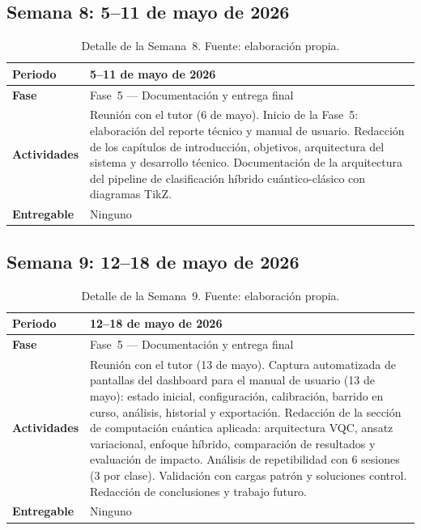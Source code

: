 \documentclass[11pt,a4paper,spanish]{book}
\begin{document}
\subsection{Semana 8: 5--11 de mayo de 2026}

\begin{table}[ht]
\centering
\begin{tabular}{p{3cm} p{10cm}}
\hline\hline
\textbf{Periodo} & 5--11 de mayo de 2026 \\ [0.5ex]
\hline
\textbf{Fase} & Fase~5 --- Documentaci\'{o}n y entrega final \\ \hline
\textbf{Actividades} & Reuni\'{o}n con el tutor (6 de mayo). Inicio de la Fase~5: elaboraci\'{o}n del reporte t\'{e}cnico y manual de usuario. Redacci\'{o}n de los cap\'{i}tulos de introducci\'{o}n, objetivos, arquitectura del sistema y desarrollo t\'{e}cnico. Documentaci\'{o}n de la arquitectura del pipeline de clasificaci\'{o}n h\'{i}brido cu\'{a}ntico-cl\'{a}sico con diagramas TikZ. \\ \hline
\textbf{Entregable} & Ninguno \\ \hline
\end{tabular}
\caption[Semana 8]{Detalle de la Semana~8. Fuente: elaboraci\'{o}n propia.}
\label{tab:semana8}
\end{table}

\subsection{Semana 9: 12--18 de mayo de 2026}

\begin{table}[ht]
\centering
\begin{tabular}{p{3cm} p{10cm}}
\hline\hline
\textbf{Periodo} & 12--18 de mayo de 2026 \\ [0.5ex]
\hline
\textbf{Fase} & Fase~5 --- Documentaci\'{o}n y entrega final \\ \hline
\textbf{Actividades} & Reuni\'{o}n con el tutor (13 de mayo). Captura automatizada de pantallas del dashboard para el manual de usuario (13 de mayo): estado inicial, configuraci\'{o}n, calibraci\'{o}n, barrido en curso, an\'{a}lisis, historial y exportaci\'{o}n. Redacci\'{o}n de la secci\'{o}n de computaci\'{o}n cu\'{a}ntica aplicada: arquitectura VQC, ansatz variacional, enfoque h\'{i}brido, comparaci\'{o}n de resultados y evaluaci\'{o}n de impacto. An\'{a}lisis de repetibilidad con 6 sesiones (3 por clase). Validaci\'{o}n con cargas patr\'{o}n y soluciones control. Redacci\'{o}n de conclusiones y trabajo futuro. \\ \hline
\textbf{Entregable} & Ninguno \\ \hline
\end{tabular}
\caption[Semana 9]{Detalle de la Semana~9. Fuente: elaboraci\'{o}n propia.}
\label{tab:semana9}
\end{table}
\end{document}

